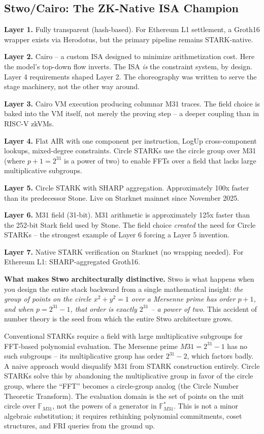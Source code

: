 \documentclass[
  11pt,
  openany]{report}
\renewcommand{\textbf}[1]{{\bfseries\color{MidnightBold}#1}}
\begin{document}
\subsection{Stwo/Cairo: The ZK-Native ISA
Champion}\label{stwocairo-the-zk-native-isa-champion}

\textbf{Layer 1.} Fully transparent (hash-based). For Ethereum L1 settlement, a
Groth16 wrapper exists via Herodotus, but the primary pipeline remains
STARK-native.

\textbf{Layer 2.} Cairo -- a custom ISA designed to minimize arithmetization
cost. Here the model's top-down flow inverts. The ISA \emph{is} the constraint
system, by design. Layer 4 requirements shaped Layer 2. The choreography was
written to serve the stage machinery, not the other way around.

\textbf{Layer 3.} Cairo VM execution producing columnar M31 traces. The field
choice is baked into the VM itself, not merely the proving step -- a deeper
coupling than in RISC-V zkVMs.

\textbf{Layer 4.} Flat AIR with one component per instruction, LogUp
cross-component lookups, mixed-degree constraints. Circle STARKs use the circle
group over M31 (where \(p+1 = 2^{31}\) is a power of two) to enable FFTs over a
field that lacks large multiplicative subgroups.

\textbf{Layer 5.} Circle STARK with SHARP aggregation. Approximately 100x faster
than its predecessor Stone. Live on Starknet mainnet since November 2025.

\textbf{Layer 6.} M31 field (31-bit). M31 arithmetic is approximately 125x
faster than the 252-bit Stark field used by Stone. The field choice
\emph{created} the need for Circle STARKs -- the strongest example of Layer 6
forcing a Layer 5 invention.

\textbf{Layer 7.} Native STARK verification on Starknet (no wrapping needed).
For Ethereum L1: SHARP-aggregated Groth16.

\textbf{What makes Stwo architecturally distinctive.} Stwo is what happens when
you design the entire stack backward from a single mathematical insight:
\emph{the group of points on the circle \(x^2 + y^2 = 1\) over a Mersenne prime
has order \(p+1\), and when \(p = 2^{31} - 1\), that order is exactly \(2^{31}\)
-- a power of two}. This accident of number theory is the seed from which the
entire Stwo architecture grows.

Conventional STARKs require a field with large multiplicative subgroups for
FFT-based polynomial evaluation. The Mersenne prime \(M31 = 2^{31} - 1\) has no
such subgroups -- its multiplicative group has order \(2^{31} - 2\), which
factors badly. A naive approach would disqualify M31 from STARK construction
entirely. Circle STARKs solve this by abandoning the multiplicative group in
favor of the circle group, where the ``FFT'' becomes a circle-group analog (the
Circle Number Theoretic Transform). The evaluation domain is the set of points
on the unit circle over \(\mathbb{F}_{M31}\), not the powers of a generator in
\(\mathbb{F}_{M31}^*\). This is not a minor algebraic substitution; it requires
rethinking polynomial commitments, coset structures, and FRI queries from the
ground up.
\end{document}
